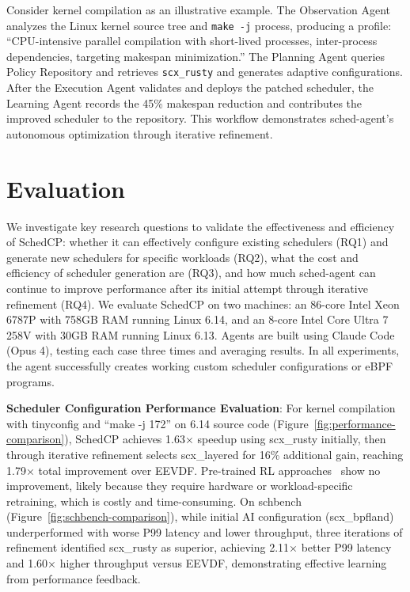 \documentclass[preprint]{article}
\newcommand{\sys}{SchedCP\xspace}
\newcommand{\agent}{sched-agent\xspace}
\begin{document}
Consider kernel compilation as an illustrative example. The Observation Agent analyzes the Linux kernel source tree and \texttt{make -j} process, producing a profile: ``CPU-intensive parallel compilation with short-lived processes, inter-process dependencies, targeting makespan minimization.'' The Planning Agent queries Policy Repository and retrieves \texttt{scx\_rusty} and generates adaptive configurations. After the Execution Agent validates and deploys the patched scheduler, the Learning Agent records the 45\% makespan reduction and contributes the improved scheduler to the repository. This workflow demonstrates \agent's autonomous optimization through iterative refinement.

\section{Evaluation}
\label{sec:evaluation}


We investigate key research questions to validate the effectiveness and efficiency of \sys: whether it can effectively configure existing schedulers (RQ1) and generate new schedulers for specific workloads (RQ2), what the cost and efficiency of scheduler generation are (RQ3), and how much \agent can continue to improve performance after its initial attempt through iterative refinement (RQ4). We evaluate \sys on two machines: an 86-core Intel Xeon 6787P with 758GB RAM running Linux 6.14, and an 8-core Intel Core Ultra 7 258V with 30GB RAM running Linux 6.13. Agents are built using Claude Code (Opus 4), testing each case three times and averaging results. In all experiments, the agent successfully creates working custom scheduler configurations or eBPF programs.

\textbf{Scheduler Configuration Performance Evaluation}: For kernel compilation with tinyconfig and ``make -j 172'' on 6.14 source code (Figure~\ref{fig:performance-comparison}), \sys achieves 1.63× speedup using scx\_rusty initially, then through iterative refinement selects scx\_layered for 16\% additional gain, reaching 1.79× total improvement over EEVDF. Pre-trained RL approaches~\cite{corbet2025ml} show no improvement, likely because they require hardware or workload-specific retraining, which is costly and time-consuming. On schbench~\cite{schbench2016} (Figure~\ref{fig:schbench-comparison}), while initial AI configuration (scx\_bpfland) underperformed with worse P99 latency and lower throughput, three iterations of refinement identified scx\_rusty as superior, achieving 2.11× better P99 latency and 1.60× higher throughput versus EEVDF, demonstrating effective learning from performance feedback.
\end{document}
